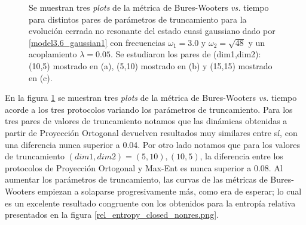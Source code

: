 \documentclass{report} %
\numberwithin{equation}{section}
\begin{document}
\begin{figure}
\caption{Se muestran tres \textit{plots} de la métrica de Bures-Wooters \textit{vs.} tiempo para distintos pares de parámetros de truncamiento para la evolución cerrada no resonante del estado cuasi gaussiano dado por \eqref{model3.6_gaussian1} con frecuencias $\omega_1 = 3.0$ y $\omega_2 =\sqrt{48}$ y un acoplamiento $\lambda = 0.05$. Se estudiaron los pares de (dim1,dim2): (10,5) mostrado en (a), (5,10) mostrado en (b) y (15,15) mostrado en (c). }
\label{closed_n_nr}
\end{figure}

En la figura \ref{closed_n_nr} se muestran tres \textit{plots} de la métrica de Bures-Wooters \textit{vs.} tiempo acorde a los tres protocolos variando los parámetros de truncamiento. Para los tres pares de valores de truncamiento notamos que las dinámicas obtenidas a partir de Proyección Ortogonal devuelven resultados muy similares entre sí, con una diferencia nunca superior a 0.04. Por otro lado notamos que para los valores de truncamiento $(dim1,dim2)=(5,10),(10,5)$, la diferencia entre los protocolos de Proyección Ortogonal y Max-Ent es nunca superior a 0.08. Al aumentar los parámetros de truncamiento, las curvas de las métricas de Bures-Wooters empiezan a solaparse progresivamente más, como era de esperar; lo cual es un excelente resultado congruente con los obtenidos para la entropía relativa presentados en la figura \ref{rel_entropy_closed_nonres.png}.
\end{document}
